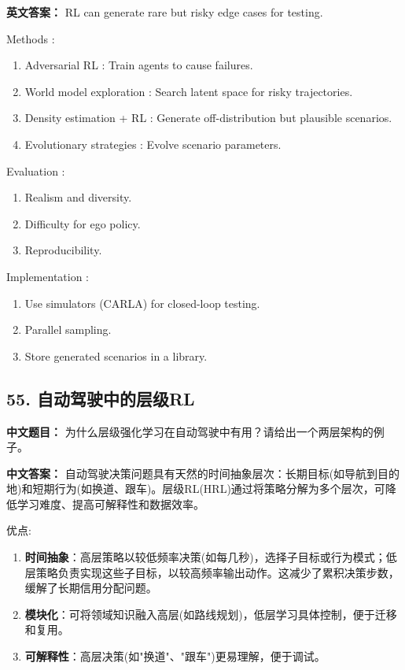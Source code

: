 \documentclass[10pt,a4paper]{ctexart}
\begin{document}
\textbf{英文答案：}  
RL can generate rare but risky edge cases for testing.

 Methods :
\begin{enumerate}
    \item Adversarial RL : Train agents to cause failures.
    \item World model exploration : Search latent space for risky trajectories.
    \item Density estimation + RL : Generate off-distribution but plausible scenarios.
    \item Evolutionary strategies : Evolve scenario parameters.
\end{enumerate}

 Evaluation :
\begin{enumerate}
    \item Realism and diversity.
    \item Difficulty for ego policy.
    \item Reproducibility.
\end{enumerate}

 Implementation :
\begin{enumerate}
    \item Use simulators (CARLA) for closed-loop testing.
    \item Parallel sampling.
    \item Store generated scenarios in a library.
\end{enumerate}

\subsection*{55. 自动驾驶中的层级RL}
\textbf{中文题目：} 为什么层级强化学习在自动驾驶中有用？请给出一个两层架构的例子。

\textbf{中文答案：}  
自动驾驶决策问题具有天然的时间抽象层次：长期目标(如导航到目的地)和短期行为(如换道、跟车)。层级RL(HRL)通过将策略分解为多个层次，可降低学习难度、提高可解释性和数据效率。

 优点:
\begin{enumerate}
    \item \textbf{时间抽象}：高层策略以较低频率决策(如每几秒)，选择子目标或行为模式；低层策略负责实现这些子目标，以较高频率输出动作。这减少了累积决策步数，缓解了长期信用分配问题。
    \item \textbf{模块化}：可将领域知识融入高层(如路线规划)，低层学习具体控制，便于迁移和复用。
    \item \textbf{可解释性}：高层决策(如"换道"、"跟车")更易理解，便于调试。
\end{enumerate}
\end{document}
